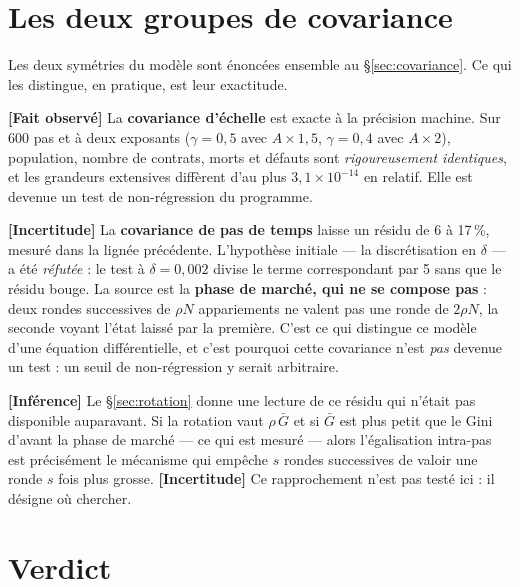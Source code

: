 \documentclass[11pt,a4paper]{article}
\newcommand{\fait}{\textbf{[Fait observé]}}
\newcommand{\inference}{\textbf{[Inférence]}}
\newcommand{\incertitude}{\textbf{[Incertitude]}}
\begin{document}


\section{Les deux groupes de covariance}
\label{sec:covariance-resultats}

Les deux symétries du modèle sont énoncées ensemble au
§\ref{sec:covariance}. Ce qui les distingue, en pratique, est leur exactitude.

\fait{} La \textbf{covariance d'échelle} est exacte à la précision machine.
Sur 600 pas et à deux exposants ($\gamma = 0{,}5$ avec $A \times 1{,}5$,
$\gamma = 0{,}4$ avec $A \times 2$), population, nombre de contrats, morts et
défauts sont \emph{rigoureusement identiques}, et les grandeurs extensives
diffèrent d'au plus $3{,}1 \times 10^{-14}$ en relatif. Elle est devenue un
test de non-régression du programme.

\incertitude{} La \textbf{covariance de pas de temps} laisse un résidu de 6 à
17\,\%, mesuré dans la lignée précédente. L'hypothèse initiale ---
la discrétisation en $\delta$ --- a été \emph{réfutée} : le test à
$\delta = 0{,}002$ divise le terme correspondant par 5 sans que le résidu
bouge. La source est la \textbf{phase de marché, qui ne se compose pas} : deux
rondes successives de $\rho N$ appariements ne valent pas une ronde de
$2\rho N$, la seconde voyant l'état laissé par la première. C'est ce qui
distingue ce modèle d'une équation différentielle, et c'est pourquoi cette
covariance n'est \emph{pas} devenue un test : un seuil de non-régression y
serait arbitraire.

\inference{} Le §\ref{sec:rotation} donne une lecture de ce résidu qui n'était
pas disponible auparavant. Si la rotation vaut $\rho\,\bar G$ et si $\bar G$
est plus petit que le Gini d'avant la phase de marché --- ce qui est mesuré ---
alors l'égalisation intra-pas est précisément le mécanisme qui empêche $s$
rondes successives de valoir une ronde $s$ fois plus grosse. \incertitude{}
Ce rapprochement n'est pas testé ici : il désigne où chercher.

\section{Verdict}
\label{sec:verdict}
\end{document}
